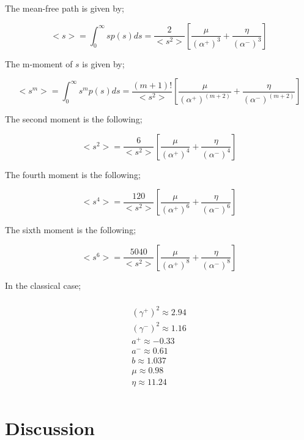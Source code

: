 \documentclass[preprint,12pt]{elsarticle}
\newcommand{\bl}{\big<}
\newcommand{\bg}{\big>}
\begin{document}
The mean-free path is given by;

\begin{equation}
{\bl s\bg} = \int_0^\infty sp(s) ds = \frac{2}{{\bl s^2 \bg}}\left[\frac{\mu}{\left(\alpha^+\right)^3} + \frac{\eta}{\left(\alpha^-\right)^3}\right]
\end{equation}

The m-moment of $s$ is given by;

\begin{equation}
{\bl s^m \bg} = \int_0^\infty s^m p(s) ds = \frac{(m+1)!}{{\bl s^2 \bg}}\left[\frac{\mu}{\left(\alpha^+\right)^{(m+2)}} + \frac{\eta}{\left(\alpha^-\right)^{(m+2)}}\right]
\end{equation}

The second moment is the following;

\begin{equation}
{\bl s^2 \bg} = \frac{6}{{\bl s^2 \bg}}\left[\frac{\mu}{\left(\alpha^+\right)^{4}} + \frac{\eta}{\left(\alpha^-\right)^{4}}\right]
\end{equation}

The fourth moment is the following;

\begin{equation}
{\bl s^4 \bg} = \frac{120}{{\bl s^2 \bg}}\left[\frac{\mu}{\left(\alpha^+\right)^{6}} + \frac{\eta}{\left(\alpha^-\right)^{6}}\right]
\end{equation}

The sixth moment is the following;

\begin{equation}
{\bl s^6 \bg} = \frac{5040}{{\bl s^2 \bg}}\left[\frac{\mu}{\left(\alpha^+\right)^{8}} + \frac{\eta}{\left(\alpha^-\right)^{8}}\right]
\end{equation}

In the classical case;

\begin{multline}
\\
(\gamma^+)^2 \approx 2.94 \\
(\gamma^-)^2 \approx 1.16 \\
a^+ \approx -0.33 \\
a^- \approx 0.61 \\
b \approx 1.037 \\
\mu \approx 0.98\\
\eta \approx 11.24 \\
\end{multline}

\section{Discussion}\label{sec6}
\setcounter{section}{4}
\end{document}

